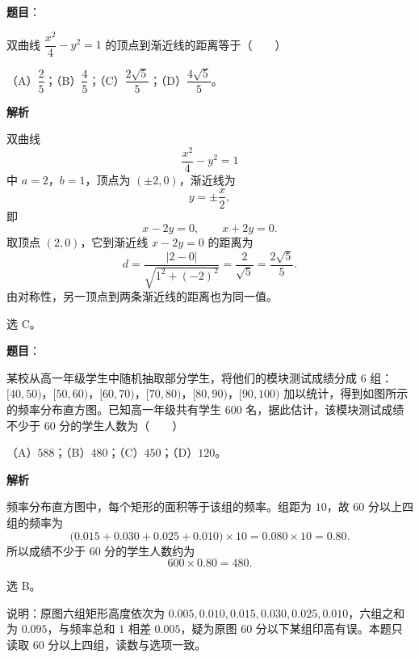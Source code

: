 \begin{answer}

\textbf{题目}：

双曲线 $\dfrac{x^2}{4}-y^2=1$ 的顶点到渐近线的距离等于\mbox{（　　）}

（A）$\dfrac25$；（B）$\dfrac45$；（C）$\dfrac{2\sqrt5}{5}$；（D）$\dfrac{4\sqrt5}{5}$。

\textbf{解析}

双曲线
\nopagebreak[4]
\[\frac{x^2}{4}-y^2=1\]
中 $a=2$，$b=1$，顶点为 $(\pm2,0)$，渐近线为
\nopagebreak[4]
\[y=\pm\frac{x}{2},\]
即
\nopagebreak[4]
\[x-2y=0,\qquad x+2y=0.\]
取顶点 $(2,0)$，它到渐近线 $x-2y=0$ 的距离为
\nopagebreak[4]
\[d=\frac{|2-0|}{\sqrt{1^2+(-2)^2}}=\frac{2}{\sqrt5}=\frac{2\sqrt5}{5}.\]
由对称性，另一顶点到两条渐近线的距离也为同一值。

选 C。


\end{answer}
\begin{answer}

\textbf{题目}：

某校从高一年级学生中随机抽取部分学生，将他们的模块测试成绩分成 $6$ 组：$[40,50)$，$[50,60)$，$[60,70)$，$[70,80)$，$[80,90)$，$[90,100)$ 加以统计，得到如图所示的频率分布直方图。已知高一年级共有学生 $600$ 名，据此估计，该模块测试成绩不少于 $60$ 分的学生人数为\mbox{（　　）}
\nopagebreak[4]
\begin{center}\end{center}
\nopagebreak[4]
（A）$588$；（B）$480$；（C）$450$；（D）$120$。

\textbf{解析}

频率分布直方图中，每个矩形的面积等于该组的频率。组距为 $10$，故 $60$ 分以上四组的频率为
\nopagebreak[4]
\[\bigl(0.015+0.030+0.025+0.010\bigr)\times10=0.080\times10=0.80.\]
所以成绩不少于 $60$ 分的学生人数约为
\nopagebreak[4]
\[600\times0.80=480.\]

选 B。

\begin{gktip}
说明：原图六组矩形高度依次为 $0.005,0.010,0.015,0.030,0.025,0.010$，六组之和为 $0.095$，与频率总和 $1$ 相差 $0.005$，疑为原图 $60$ 分以下某组印高有误。本题只读取 $60$ 分以上四组，读数与选项一致。
\end{gktip}


\end{answer}
